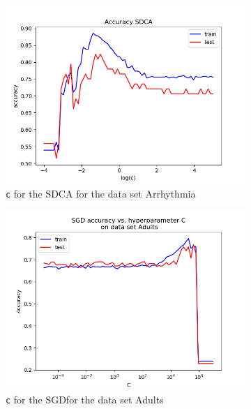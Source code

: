 \documentclass{article}
\begin{document}
\begin{figure}[H]
\begin{subfigure}[t]{0.45\linewidth}
		\includegraphics[width=\linewidth]{figs/hyperparams/arrythmia_sdca_c.png}
		\caption{\texttt{c} for the SDCA for the data set Arrhythmia}
	\end{subfigure}
	\begin{subfigure}[t]{0.45\linewidth}
		\includegraphics[width=\linewidth]{figs/hyperparams/adults_sgd_c.png}
		\caption{\texttt{c} for the SGDfor the data set Adults}
	\end{subfigure}
	\begin{subfigure}[t]{0.45\linewidth}

\end{subfigure}
\end{figure}
\end{document}
